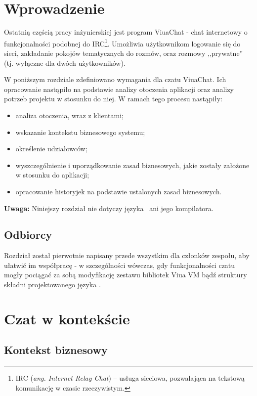 \section{Wprowadzenie}

Ostatnią częścią pracy inżynierskiej jest program ViuaChat - chat internetowy o funkcjonalności podobnej do IRC\footnote{IRC (\textit{ang. Internet Relay Chat}) -- usługa sieciowa, pozwalająca na tekstową komunikację w czasie rzeczywistym.}.
Umożliwia użytkownikom logowanie się do sieci, zakładanie pokojów tematycznych do rozmów, oraz rozmowy
,,prywatne'' (tj. wyłączne dla dwóch użytkowników).

W poniższym rozdziale zdefiniowano wymagania dla czatu ViuaChat. Ich opracowanie nastąpiło na podstawie analizy otoczenia aplikacji oraz analizy potrzeb projektu w stosunku do niej. W ramach tego procesu nastąpiły:
\begin{itemize}
    \item analiza otoczenia, wraz z klientami;
    \item wskazanie kontekstu biznesowego systemu;
    \item określenie udziałowców;
	\item wyszczególnienie i uporządkowanie zasad biznesowych, jakie zostały założone w stosunku do aplikacji;
	\item opracowanie historyjek na podstawie ustalonych zasad biznesowych.
\end{itemize}

\textbf{Uwaga:} Niniejszy rozdział nie dotyczy języka \ViuAct\ ani jego kompilatora.

\subsection{Odbiorcy}
Rozdział został pierwotnie napisany przede wszystkim dla członków zespołu, aby ułatwić im współpracę - w
szczególności wówczas, gdy funkcjonalności czatu mogły pociągać za sobą modyfikację zestawu bibliotek Viua VM
bądź struktury składni projektowanego języka \ViuAct.

\section{Czat w kontekście}

\subsection{Kontekst biznesowy}

